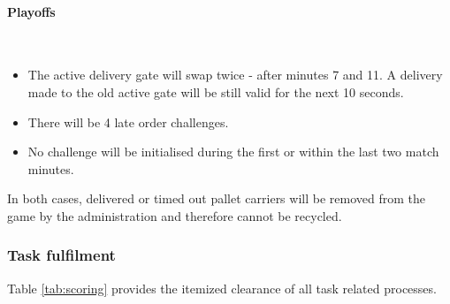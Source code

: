 \documentclass[12pt,twoside]{article}
\begin{document}
\paragraph{Playoffs}~\\
\begin{itemize}
\item The active delivery gate will swap twice - after minutes 7
  and 11. A delivery made to the old active gate will be still
  valid for the next 10 seconds.
\item There will be 4 late order challenges. 
\item No challenge will be initialised during the first or within
  the last two match minutes.
\end{itemize}
     

In both cases, delivered or timed out pallet carriers will be removed
from the game by the administration and therefore cannot be recycled.

\subsubsection{Task fulfilment}

Table \ref{tab:scoring} provides the itemized clearance of all task
related processes.
\end{document}
